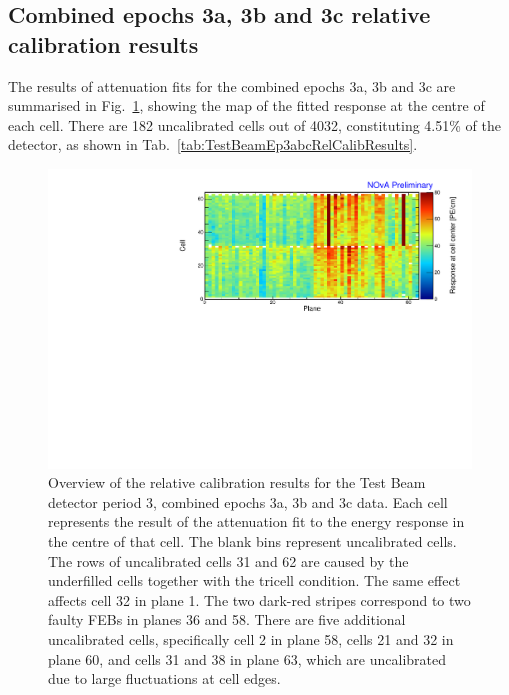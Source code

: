 \subsection*{Combined epochs 3a, 3b and 3c relative calibration results}

The results of attenuation fits for the combined epochs 3a, 3b and 3c are summarised in Fig.~\ref{fig:CellCentreResponseEp3abc}, showing the map of the fitted response at the centre of each cell. There are 182 uncalibrated cells out of 4032, constituting 4.51\% of the detector, as shown in Tab.~\ref{tab:TestBeamEp3abcRelCalibResults}.

\begin{figure}[!hbtp]
\centering
\includegraphics[width=\textwidth]{Plots/TBCalibration/CellResponseAtCentre_epoch3abc_Limited_NOvAPlotStyle.pdf}
\caption[Map of fitted response at cell centre for epochs 3a, 3b and 3c data]{Overview of the relative calibration results for the Test Beam detector period 3, combined epochs 3a, 3b and 3c data. Each cell represents the result of the attenuation fit to the energy response in the centre of that cell. The blank bins represent uncalibrated cells. The rows of uncalibrated cells 31 and 62 are caused by the underfilled cells together with the tricell condition. The same effect affects cell 32 in plane 1. The two dark-red stripes correspond to two faulty \glspl{FEB} in planes 36 and 58. There are five additional uncalibrated cells, specifically cell 2 in plane 58, cells 21 and 32 in plane 60, and cells 31 and 38 in plane 63, which are uncalibrated due to large fluctuations at cell edges.}
\label{fig:CellCentreResponseEp3abc}
\end{figure}

